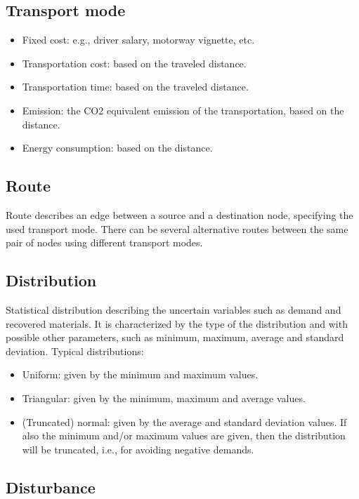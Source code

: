 \documentclass{article}
\begin{document}
\subsection{Transport mode}

\begin{itemize}
\item Fixed cost: e.g., driver salary, motorway vignette, etc.
\item Transportation cost: based on the traveled distance.
\item Transportation time: based on the traveled distance.
\item Emission: the CO2 equivalent emission of the transportation, based on the distance.
\item Energy consumption: based on the distance.
\end{itemize}


\subsection{Route}

Route describes an edge between a source and a destination node, specifying the used transport mode. There can be several alternative routes between the same pair of nodes using different transport modes.


\subsection{Distribution}

Statistical distribution describing the uncertain variables such as demand and recovered materials. It is characterized by the type of the distribution and with possible other parameters, such as minimum, maximum, average and standard deviation. Typical distributions:

\begin{itemize}
\item Uniform: given by the minimum and maximum values.
\item Triangular: given by the minimum, maximum and average values.
\item (Truncated) normal: given by the average and standard deviation values. If also the minimum and/or maximum values are given, then the distribution will be truncated, i.e., for avoiding negative demands.
\end{itemize}


\subsection{Disturbance}
\end{document}

